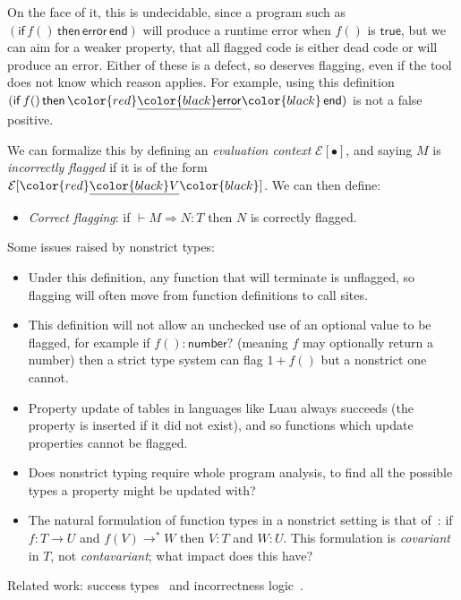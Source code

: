 \documentclass[acmsmall]{acmart}
\newcommand{\squnder}[1]{\color{red}\underline{{\color{black}#1}}\color{black}}
\newcommand{\evCtx}{\mathcal{E}}
\newcommand{\TRUE}{\mathsf{true}}
\newcommand{\NUMBER}{\mathsf{number}}
\newcommand{\ERROR}{\mathsf{error}}
\newcommand{\IF}{\mathsf{if}\,}
\newcommand{\THEN}{\,\mathsf{then}\,}
\newcommand{\END}{\,\mathsf{end}}
\begin{document}
On the face of it, this is undecidable, since a program such as
$(\IF f() \THEN \ERROR \END)$ will produce a runtime error when $f()$ is
$\TRUE$, but we can aim for a weaker property, that all flagged code
is either dead code or will produce an error. Either of these is a
defect, so deserves flagging, even if the tool does not know
which reason applies. For example, using this definition
$(\IF f() \THEN \squnder{\ERROR} \END)$ is not a false positive.

We can formalize this by defining an \emph{evaluation context}
$\evCtx[\bullet]$, and saying $M$ is \emph{incorrectly flagged}
if it is of the form $\evCtx[\squnder{V}]$. We can then define:
\begin{itemize}
\item \emph{Correct flagging}: if ${} \vdash M \Rightarrow N : T$
  then $N$ is correctly flagged.
\end{itemize}
Some issues raised by nonstrict types:
\begin{itemize}

\item Under this definition, any function that will terminate is unflagged, so
  flagging will often move from function definitions to call sites.

\item This definition will not allow an unchecked use of an optional value
  to be flagged, for example if $f() : \NUMBER?$ (meaning $f$ may optionally return a number)
  then a strict type system can flag $1 + f()$ but a nonstrict one cannot.

\item Property update of tables in languages like Luau always succeeds
  (the property is inserted if it did not exist), and so functions which
  update properties cannot be flagged.

\item Does nonstrict typing require whole program analysis,
  to find all the possible types a property might be updated with?

\item The natural formulation of function types in a nonstrict setting
  is that of~\cite{???}: if $f: T \rightarrow U$ and $f(V) \rightarrow^* W$
  then $V:T$ and $W:U$. This formulation is \emph{covariant} in $T$,
  not \emph{contavariant}; what impact does this have?
  
\end{itemize}
Related work: success types~\cite{???} and incorrectness logic~\cite{???}.
\end{document}
